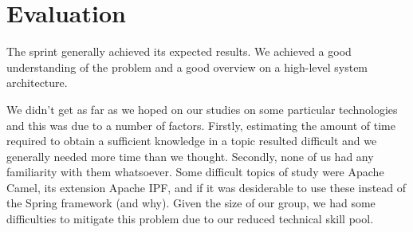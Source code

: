 \section{Evaluation}

The sprint generally achieved its expected results.
We achieved a good understanding of the problem and a good overview
on a high-level system architecture.

We didn't get as far as we hoped on our studies on some particular technologies
and this was due to a number of factors.
Firstly, estimating the amount of time required to obtain a sufficient knowledge
in a topic resulted difficult and we generally needed more time than we thought.
Secondly, none of us had any familiarity with them whatsoever.
Some difficult topics of study were Apache Camel, its extension Apache IPF,
and if it was desiderable to use these instead of the Spring framework (and why).
Given the size of our group, we had some difficulties to mitigate this problem due to
our reduced technical skill pool.




